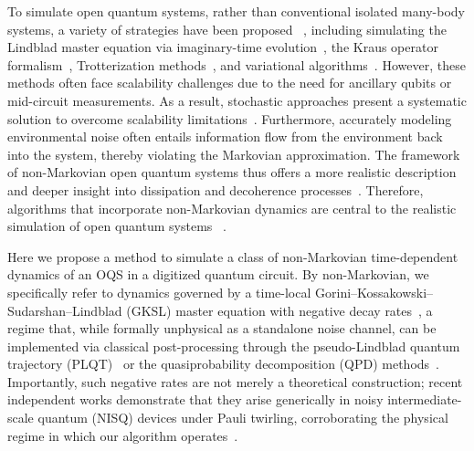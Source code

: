 \documentclass[10pt, superscriptaddress,aps,pra,twocolumn,showpacs,nofootinbib, longbibliography, notitlepage,floatfix]{revtex4-2}
\begin{document}
To simulate open quantum systems, rather than conventional isolated many-body systems, a variety of strategies have been proposed ~\cite{Nori_pra_2011, Solano_Pra_2016, PRXQuantum.5.020332, Delgado_Granados2025}, including simulating the Lindblad master equation via imaginary-time evolution~\cite{PRXQuantum_Motta_2022}, the Kraus operator formalism~\cite{Hu2020, Mazziotti_PRL_2021}, Trotterization methods~\cite{PhysRevLett.127.020504}, and variational algorithms~\cite{PRR_VQE_NESS_2020_Fujii, 2020_prl_Endo}. However, these methods often face scalability challenges due to the need for ancillary qubits or mid-circuit measurements. As a result, stochastic approaches present a systematic solution to overcome scalability limitations~\cite{Aurelia_adc_2017, Narang_PRR_2021, peng2024quantumtrajectoryinspiredlindbladiansimulation, Sandro_Donadi_PRR_2024, borras2024quantumalgorithmsimulatelindblad, liu2024simulationopenquantumsystems, huang2025robustvariationalquantumsimulation}. Furthermore, accurately modeling environmental noise often entails information flow from the environment back into the system, thereby violating the Markovian approximation. The framework of non-Markovian open quantum systems thus offers a more realistic description and deeper insight into dissipation and decoherence processes~\cite{Zoller_book_noise}. Therefore, algorithms that incorporate non-Markovian dynamics are central to the realistic simulation of open quantum systems ~\cite{Modi_PRXQuantum_2021, trivdei_cirac_2025_arxiv, cai_non_markov_2025}.

{Here we propose a method to simulate a class of non-Markovian time-dependent dynamics of an OQS in a digitized quantum circuit. By non-Markovian, we specifically refer to dynamics governed by a time-local Gorini–Kossakowski–Sudarshan–Lindblad (GKSL)  master equation with negative decay rates~\cite{Breuer_book}, a regime that, while formally unphysical as a standalone noise channel, can be implemented via classical post-processing through the pseudo-Lindblad quantum trajectory (PLQT)~\cite{Eckardt_PRL} or the quasiprobability decomposition (QPD) methods~\cite{Gambetta2017PRL, Cai_QEM_2023}. Importantly, such negative rates are not merely a theoretical construction; recent independent works demonstrate that they arise generically in noisy intermediate-scale quantum (NISQ) devices under Pauli twirling, corroborating the physical regime in which our algorithm operates~\cite{kattemolle2026_arxiv, seif2026_arxiv}.}
\end{document}
